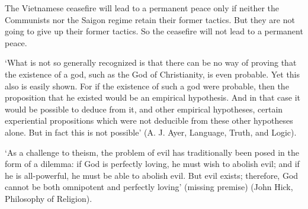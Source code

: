 \begin{enumerate}
	\begin{statement} {The Vietnamese ceasefire will lead to a permanent peace only
			if neither the Communists nor the Saigon regime retain their former tactics.
			But they are not going to give up their former tactics. So the ceasefire
			will not lead to a permanent peace.}
	\end{statement}


	\begin{statement}{ ‘What is not so generally recognized is that there can be no
			way of proving that the existence of a god, such as the God of Christianity,
			is even probable. Yet this also is easily shown. For if the existence of
			such a god were probable, then the proposition that he existed would be an
			empirical hypothesis. And in that case it would be possible to deduce from
			it, and other empirical hypotheses, certain experiential propositions which
			were not deducible from these other hypotheses alone. But in fact this is
			not possible' (A. J. Ayer, Language, Truth, and Logic).}

	\end{statement}

	\begin{statement}{‘As a challenge to theism, the problem of evil has
			traditionally been posed in the form of a dilemma: if God is perfectly
			loving, he must wish to abolish evil; and if he is all-powerful, he must be
			able to abolish evil. But evil exists; therefore, God cannot be both
			omnipotent and perfectly loving' (missing premise) (John Hick, Philosophy of
			Religion).}
	\end{statement}


\end{enumerate}
